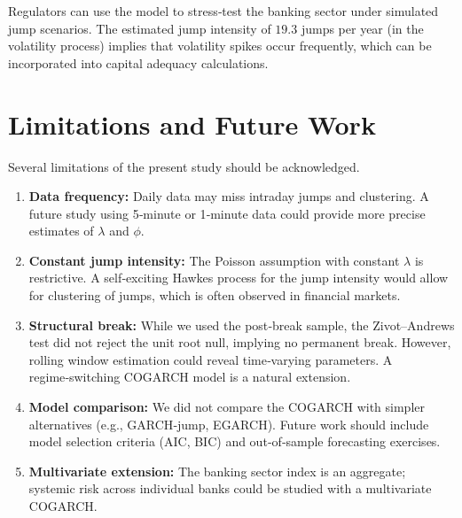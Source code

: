 Regulators can use the model to stress‑test the banking sector under simulated jump scenarios. The estimated jump intensity of $19.3$ jumps per year (in the volatility process) implies that volatility spikes occur frequently, which can be incorporated into capital adequacy calculations.

\section{Limitations and Future Work}
Several limitations of the present study should be acknowledged.
\begin{enumerate}
    \item \textbf{Data frequency:} Daily data may miss intraday jumps and clustering. A future study using 5‑minute or 1‑minute data could provide more precise estimates of $\lambda$ and $\phi$.
    \item \textbf{Constant jump intensity:} The Poisson assumption with constant $\lambda$ is restrictive. A self‑exciting Hawkes process for the jump intensity would allow for clustering of jumps, which is often observed in financial markets.
    \item \textbf{Structural break:} While we used the post‑break sample, the Zivot–Andrews test did not reject the unit root null, implying no permanent break. However, rolling window estimation could reveal time‑varying parameters. A regime‑switching COGARCH model is a natural extension.
    \item \textbf{Model comparison:} We did not compare the COGARCH with simpler alternatives (e.g., GARCH‑jump, EGARCH). Future work should include model selection criteria (AIC, BIC) and out‑of‑sample forecasting exercises.
    \item \textbf{Multivariate extension:} The banking sector index is an aggregate; systemic risk across individual banks could be studied with a multivariate COGARCH.
\end{enumerate}
